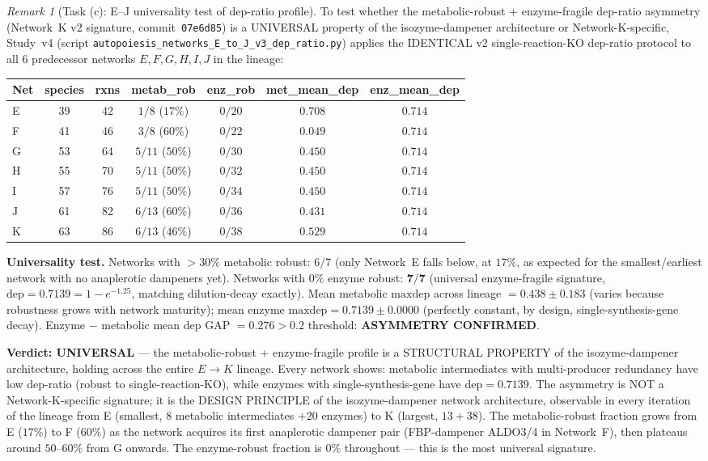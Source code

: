 \documentclass[11pt,a4paper]{article}
\theoremstyle{plain}
\theoremstyle{definition}
\theoremstyle{remark}
\newtheorem{remark}[theorem]{Remark}
\begin{document}
\begin{remark}[Task (c): E--J universality test of dep-ratio profile]
\label{rem:networks-E-J-v3-dep-ratio-v4}
To test whether the metabolic-robust + enzyme-fragile dep-ratio
asymmetry (Network~K v2 signature, commit~\texttt{07e6d85}) is a
UNIVERSAL property of the isozyme-dampener architecture or
Network-K-specific, Study~v4 (script
\texttt{autopoiesis\_networks\_E\_to\_J\_v3\_dep\_ratio.py}) applies
the IDENTICAL v2 single-reaction-KO dep-ratio protocol to all $6$
predecessor networks $E, F, G, H, I, J$ in the lineage:
\begin{center}
\begin{tabular}{lcccccc}
\toprule
Net & species & rxns & metab\_rob & enz\_rob & met\_mean\_dep & enz\_mean\_dep \\
\midrule
E & 39 & 42 & $1/8$ ($17\%$) & $0/20$ & $0.708$ & $0.714$ \\
F & 41 & 46 & $3/8$ ($60\%$) & $0/22$ & $0.049$ & $0.714$ \\
G & 53 & 64 & $5/11$ ($50\%$) & $0/30$ & $0.450$ & $0.714$ \\
H & 55 & 70 & $5/11$ ($50\%$) & $0/32$ & $0.450$ & $0.714$ \\
I & 57 & 76 & $5/11$ ($50\%$) & $0/34$ & $0.450$ & $0.714$ \\
J & 61 & 82 & $6/13$ ($60\%$) & $0/36$ & $0.431$ & $0.714$ \\
K & 63 & 86 & $6/13$ ($46\%$) & $0/38$ & $0.529$ & $0.714$ \\
\bottomrule
\end{tabular}
\end{center}
\textbf{Universality test.} Networks with $>30\%$ metabolic robust:
$6/7$ (only Network~E falls below, at $17\%$, as expected for the
smallest/earliest network with no anaplerotic dampeners yet).
Networks with $0\%$ enzyme robust: $\mathbf{7/7}$ (universal
enzyme-fragile signature, $\mathrm{dep} = 0.7139 = 1 - e^{-1.25}$, matching
dilution-decay exactly). Mean metabolic $\mathrm{maxdep}$ across lineage
$= 0.438 \pm 0.183$ (varies because robustness grows with network
maturity); mean enzyme $\mathrm{maxdep} = 0.7139 \pm 0.0000$ (perfectly
constant, by design, single-synthesis-gene decay). Enzyme $-$ metabolic
mean dep GAP $= 0.276 > 0.2$ threshold: \textbf{ASYMMETRY CONFIRMED}.

\textbf{Verdict: UNIVERSAL} --- the metabolic-robust + enzyme-fragile
profile is a STRUCTURAL PROPERTY of the isozyme-dampener architecture,
holding across the entire $E \to K$ lineage. Every network shows:
metabolic intermediates with multi-producer redundancy have low dep-ratio
(robust to single-reaction-KO), while enzymes with
single-synthesis-gene have $\mathrm{dep} = 0.7139$. The asymmetry is NOT a
Network-K-specific signature; it is the DESIGN PRINCIPLE of the
isozyme-dampener network architecture, observable in every iteration of
the lineage from E (smallest, $8$ metabolic intermediates $+ 20$
enzymes) to K (largest, $13 + 38$). The metabolic-robust fraction grows
from E ($17\%$) to F ($60\%$) as the network acquires its first
anaplerotic dampener pair (FBP-dampener ALDO3/4 in Network~F), then
plateaus around $50$--$60\%$ from G onwards. The enzyme-robust fraction
is $0\%$ throughout --- this is the most universal signature.


\end{remark}
\end{document}
